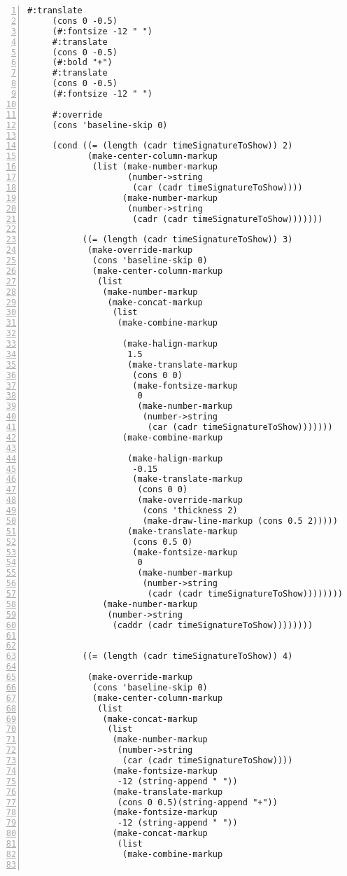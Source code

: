 \begin{Verbatim}[numbers=left,xleftmargin=5mm]
     #:translate
     (cons 0 -0.5)
     (#:fontsize -12 " ")
     #:translate
     (cons 0 -0.5)
     (#:bold "+")
     #:translate
     (cons 0 -0.5)
     (#:fontsize -12 " ")

     #:override
     (cons 'baseline-skip 0)

     (cond ((= (length (cadr timeSignatureToShow)) 2)
            (make-center-column-markup
             (list (make-number-markup
                    (number->string
                     (car (cadr timeSignatureToShow))))
                   (make-number-markup
                    (number->string
                     (cadr (cadr timeSignatureToShow)))))))

           ((= (length (cadr timeSignatureToShow)) 3)
            (make-override-markup
             (cons 'baseline-skip 0)
             (make-center-column-markup
              (list
               (make-number-markup
                (make-concat-markup
                 (list
                  (make-combine-markup

                   (make-halign-markup
                    1.5
                    (make-translate-markup
                     (cons 0 0)
                     (make-fontsize-markup
                      0
                      (make-number-markup
                       (number->string
                        (car (cadr timeSignatureToShow)))))))
                   (make-combine-markup

                    (make-halign-markup
                     -0.15
                     (make-translate-markup
                      (cons 0 0)
                      (make-override-markup
                       (cons 'thickness 2)
                       (make-draw-line-markup (cons 0.5 2)))))
                    (make-translate-markup
                     (cons 0.5 0)
                     (make-fontsize-markup
                      0
                      (make-number-markup
                       (number->string
                        (cadr (cadr timeSignatureToShow)))))))))))
               (make-number-markup
                (number->string
                 (caddr (cadr timeSignatureToShow))))))))


           ((= (length (cadr timeSignatureToShow)) 4)

            (make-override-markup
             (cons 'baseline-skip 0)
             (make-center-column-markup
              (list
               (make-concat-markup
                (list
                 (make-number-markup
                  (number->string
                   (car (cadr timeSignatureToShow))))
                 (make-fontsize-markup
                  -12 (string-append " "))
                 (make-translate-markup
                  (cons 0 0.5)(string-append "+"))
                 (make-fontsize-markup
                  -12 (string-append " "))
                 (make-concat-markup
                  (list
                   (make-combine-markup


\end{Verbatim}
